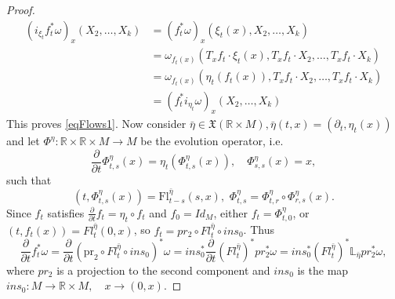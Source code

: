 \documentclass{article}
\numberwithin{theorem}{section}
\theoremstyle{definition}
\begin{document}
\begin{proof}
    \begin{equation*}
        \begin{split}
           \left(i_{\xi_t} f_t^* \omega\right)_x\left(X_2, \ldots, X_k\right) &= \left(f_t^* \omega\right)_x\left(\xi_t(x), X_2, \ldots, X_k\right)\\
            &=\omega_{f_t(x)}\left(T_x f_t \cdot \xi_t(x), T_x f_t \cdot X_2, \ldots, T_x f_t \cdot X_k\right) \\
            &=\omega_{f_t(x)}\left(\eta_t\left(f_t(x)\right), T_x f_t \cdot X_2, \ldots, T_x f_t \cdot X_k\right) \\
            &= \left(f_t^* i_{\eta_t}  \omega\right)_x\left(X_2, \ldots, X_k\right)
        \end{split}
    \end{equation*}
    This proves \eqref{eqFlows1}. Now consider $\bar{\eta} \in \mathfrak{X}(\mathbb{R} \times M), \bar{\eta}(t, x)=\left(\partial_t, \eta_t(x)\right)$ and let $\Phi^\eta : \mathbb{R} \times \mathbb{R} \times M \rightarrow M$ be the evolution operator, i.e.
    \begin{equation*}
        \frac{\partial}{\partial t} \Phi_{t, s}^\eta(x)=\eta_t\left(\Phi_{t, s}^\eta(x)\right), \quad \Phi_{s, s}^\eta(x) = x,
    \end{equation*}
    such that 
    \begin{equation*}
        \left(t, \Phi_{t, s}^\eta(x)\right)=\mathrm{Fl}_{t-s}^{\bar{\eta}}(s, x), \hspace{4pt} \Phi_{t, s}^\eta=\Phi_{t, r}^\eta \circ \Phi_{r, s}^\eta(x).
    \end{equation*}
    Since $f_t$ satisfies 
    $\frac{\partial}{\partial t} f_t = \eta_t \circ f_t$ and $ f_0 = Id_M$, either $f_t = \Phi^\eta_{t,0}$, or $(t,f_t(x)) = Fl^{\bar{\eta}}_t(0,x)$, so $f_t = pr_2 \circ Fl^{\bar{\eta}}_t \circ ins_0$. Thus
    \begin{equation*}
        \frac{\partial}{\partial t} f_t^* \omega=\frac{\partial}{\partial t}\left(\mathrm{pr}_2 \circ Fl_t^{\bar{\eta}} \circ ins_0\right)^*\omega = ins_0^* \frac{\partial}{\partial t}(Fl_t^{\bar{\eta}})^*pr_2^*\omega = ins_0^*(Fl^{\bar{\eta}}_t)^*\mathbb{L}_{\bar{\eta}}pr_2^*\omega,
    \end{equation*}
    where $pr_2$ is a projection to the second component and $ins_0$ is the map $ ins_0: M \to \mathbb{R} \times M, \quad x \to (0, x)$.


\end{proof}
\end{document}
